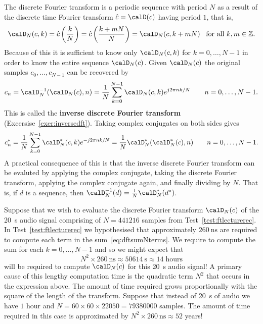 \documentclass[11pt,a4paper]{book}
\theoremstyle{plain}
\numberwithin{equation}{section}
\newcommand{\ints}{{\mathbb Z}}
\newcommand{\term}{\textbf}
\newcounter{test}
\begin{document}
The discrete Fourier transform is a periodic sequence with period $N$ as a result of the discrete time Fourier transform $\hat{c} = \calD(c)$ having period $1$, that is,
\[
\calD_N(c,k) = \hat{c}\left( \frac{k}{N} \right) = \hat{c}\left( \frac{k + mN}{N} \right) = \calD_N(c,k+mN) \;\;\; \text{for all $k,m\in\ints$}.
\]
Because of this it is sufficient to know only $\calD_N(c,k)$ for $k = 0,\dots,N-1$ in order to know the entire sequence $\calD_N(c)$.  Given $\calD_N(c)$ the original samples $c_0, \dots, c_{N-1}$ can be recovered by 
\[
c_n = \calD_N^{-1}(\calD_N(c),n) = \frac{1}{N}\sum_{k = 0}^{N-1} \calD_N(c,k) e^{j 2\pi n k / N} \qquad n = 0, \dots, N-1.
\]
This is called the \term{inverse discrete Fourier transform} (Excersise~\ref{exer:inversedft}). Taking complex conjugates on both sides gives
\[
c_n^* = \frac{1}{N} \sum_{k = 0}^{N-1} \calD_N^*(c,k) e^{-j 2\pi n k / N} = \frac{1}{N} \calD_N^*(\calD_N^*(c), n)  \qquad n = 0, \dots, N-1.
\]
A practical consequence of this is that the inverse discrete Fourier transform can be evaluted by applying the complex conjugate, taking the discrete Fourier transform, applying the complex conjugate again, and finally dividing by $N$.  That is, if $d$ is a sequence, then $\calD_N^{-1}(d) = \tfrac{1}{N}\calD_N^*(d^*)$.

Suppose that we wish to evaluate the discrete Fourier transform $\calD_N(c)$ of the \SI{20}{\second} audio signal comprising of $N=441216$ samples from Test~\ref{test:ftlecturerec}.  In Test~\ref{test:ftlecturerec} we hypothesised that approximately $\SI{260}{\nano\second}$ are required to compute each term in the sum~\eqref{eq:dftsumNterms}.  We require to compute the sum for each $k = 0,\dots,N-1$ and so we might expect that
\begin{equation}\label{eq:runtimefftformulaapprox}
N^2 \times \SI{260}{\nano\second} \approx \SI{50614}{\second} \approx 14 \; \text{hours}
\end{equation}
will be required to compute $\calD_N(c)$ for this \SI{20}{\second} audio signal!  A primary cause of this lengthy computation time is the quadratic term $N^2$ that occurs in the expression above.  The amount of time required grows proportionally with the square of the length of the transform.  Suppose that instead of \SI{20}{\second} of audio we have $1$ hour and $N = 60 \times 60 \times 22050 = 79380000$ samples.  The amount of time required in this case is approximated by $N^2 \times \SI{260}{\nano\second}  \approx 52$ years!
\end{document}
